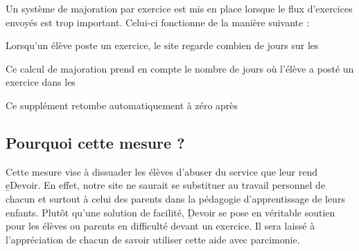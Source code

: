 ﻿Un système de majoration par exercice est mis en place lorsque le flux d’exercices envoyés est trop important. Celui-ci fonctionne de la manière suivante :
\item Lorsqu’un élève poste un exercice, le site regarde combien de jours sur les %
\item Ce calcul de majoration prend en compte le nombre de jours où l’élève a posté un exercice dans les %
\item Ce supplément retombe automatiquement à zéro après %

\subsection{Pourquoi cette mesure ?}

Cette mesure vise à dissuader les élèves d’abuser du service que leur rend \b{eDevoir}. En effet, notre site ne saurait se substituer au travail personnel de chacun et surtout à celui des parents dans la pédagogie d’apprentissage de leurs enfants. Plutôt qu’une solution de facilité, \b{Devoir} se pose en véritable soutien pour les élèves ou parents en difficulté devant un exercice.
Il sera laissé à l'appréciation de chacun de savoir utiliser cette aide avec parcimonie.